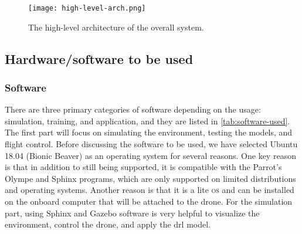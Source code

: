 \documentclass[../main.tex]{subfiles}
\begin{document}
\begin{figure}[tbp]
    \centering
    \texttt{[image: high-level-arch.png]}
    \caption{The high-level architecture of the overall system.}
    \label{fig:arch-fig}
\end{figure}


\subsection{Hardware/software to be used}\label{sec:hardware-software}

\subsubsection{Software}

There are three primary categories of software 
depending on the usage: simulation, training, 
and application, and they are listed in \cref{tab:software-used}. The first part will focus on 
simulating the environment, testing the models, 
and flight control. Before discussing the software 
to be used, we have selected Ubuntu 18.04 (Bionic Beaver) 
as an operating system for several reasons. 
One key reason is that in addition to
still being supported, it is compatible with the 
Parrot's Olympe and Sphinx programs, which are only 
supported on limited distributions and operating systems.
Another reason is that it is a lite \textsc{os} 
and can be installed on the onboard computer that 
will be attached to the drone. For the simulation part, 
using Sphinx and Gazebo software is very helpful
to visualize the environment, control the drone, 
and apply the \gls{drl} model. 
\end{document}
